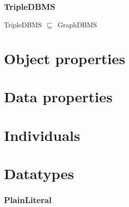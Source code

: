 \documentclass{article}
\begin{document}
\subsubsection*{TripleDBMS}

TripleDBMS~\ensuremath{\sqsubseteq}~GraphDBMS~

\section*{Object properties}\section*{Data properties}\section*{Individuals}\section*{Datatypes}\subsubsection*{PlainLiteral}
\end{document}

